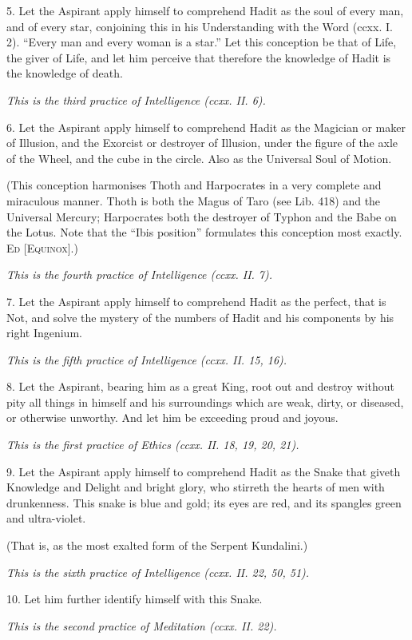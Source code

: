 5. Let the Aspirant apply himself to comprehend Hadit as the soul of every man, and of every star, conjoining this in his Understanding with the Word (ccxx. I. 2). \enquote{Every man and every woman is a star.} Let this conception be that of Life, the giver of Life, and let him perceive that therefore the knowledge of Hadit is the knowledge of death.

\textit{This is the third practice of Intelligence (ccxx. II. 6).}

6. Let the Aspirant apply himself to comprehend Hadit as the Magician or maker of Illusion, and the Exorcist or destroyer of Illusion, under the figure of the axle of the Wheel, and the cube in the circle. Also as the Universal Soul of Motion.

(This conception harmonises Thoth and Harpocrates in a very complete and miraculous manner. Thoth is both the Magus of Taro (see Lib. 418) and the Universal Mercury; Harpocrates both the destroyer of Typhon and the Babe on the Lotus. Note that the \enquote{Ibis position} formulates this conception most exactly. \textsc{Ed [Equinox]}.)

\textit{This is the fourth practice of Intelligence (ccxx. II. 7).}

7. Let the Aspirant apply himself to comprehend Hadit as the perfect, that is Not, and solve the mystery of the numbers of Hadit and his components by his right Ingenium.

\textit{This is the fifth practice of Intelligence (ccxx. II. 15, 16).}

8. Let the Aspirant, bearing him as a great King, root out and destroy without pity all things in himself and his surroundings which are weak, dirty, or diseased, or otherwise unworthy. And let him be exceeding proud and joyous.

\textit{This is the first practice of Ethics (ccxx. II. 18, 19, 20, 21).}

9. Let the Aspirant apply himself to comprehend Hadit as the Snake that giveth Knowledge and Delight and bright glory, who stirreth the hearts of men with drunkenness. This snake is blue and gold; its eyes are red, and its spangles green and ultra-violet.

(That is, as the most exalted form of the Serpent Kundalini.)

\textit{This is the sixth practice of Intelligence (ccxx. II. 22, 50, 51).}

10. Let him further identify himself with this Snake.

\textit{This is the second practice of Meditation (ccxx. II. 22).}

